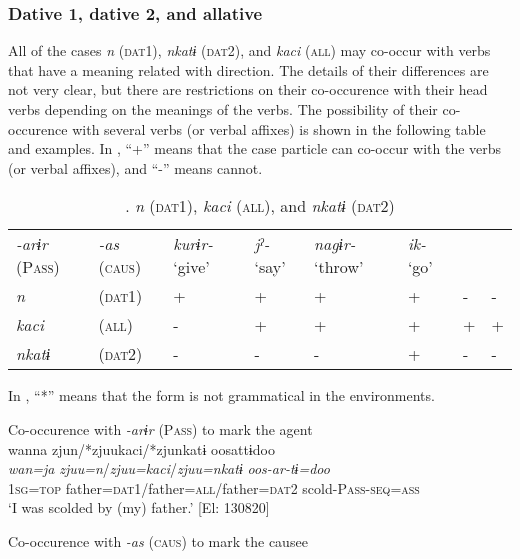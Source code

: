 \subsubsection{Dative 1, dative 2, and allative}

All of the cases \textit{n} (\textsc{dat}1), \textit{nkatɨ} (\textsc{dat2}), and \textit{kaci} (\textsc{all}) may co-occur with verbs that have a meaning related with direction. The details of their differences are not very clear, but there are restrictions on their co-occurence with their head verbs depending on the meanings of the verbs. The possibility of their co-occurence with several verbs (or verbal affixes) is shown in the following table and examples. In , “+” means that the case particle can co-occur with the verbs (or verbal affixes), and “-” means cannot.

\begin{table}
\caption{\label{tab:key:42}\textmd{.} \textmd{\textit{n}}\textmd{ (\textsc{dat}1),} \textmd{\textit{kaci}}\textmd{ (\textsc{all}), and} \textmd{\textit{nkatɨ}}\textmd{ (\textsc{dat2})}}
\begin{tabular}{llllllll}
\textit{-arɨr} (P\textsc{ass}) & \textit{-as} (\textsc{caus}) & \textit{kurɨr-} ‘give’  &\textit{jˀ-} ‘say’  &\textit{nagɨr-} ‘throw’ & \textit{ik-} ‘go’\\
\textit{n} &     (\textsc{dat}1) & + & + & + & + & - & -\\
\textit{kaci} &  (\textsc{all})  & - & + & + & + & + & +\\
\textit{nkatɨ} & (\textsc{dat}2) & - & - & - & + & - & -\\
\end{tabular}
\end{table}

In , “*” means that the form is not grammatical in the environments.

\ea\label{ex:6-82}
\ea Co-occurence with \textit{-arɨr} (P\textsc{ass}) to mark the agent\\
{\TM}
\glll wanna  zjun/*zjuukaci/*zjunkatɨ  oosattɨdoo\\
\textit{wan=ja}  \textit{zjuu=n}/\textit{zjuu=kaci}/\textit{zjuu=nkatɨ}  \textit{oos-ar-tɨ=doo}\\
    1\textsc{sg}=\textsc{top}  father=\textsc{dat}1/father=\textsc{all}/father=\textsc{dat2}  scold-P\textsc{ass}-\textsc{seq}=\textsc{ass}\\
\glt    ‘I was scolded by (my) father.’ [El: 130820]

\ex Co-occurence with \textit{-as} (\textsc{caus}) to mark the causee\\

